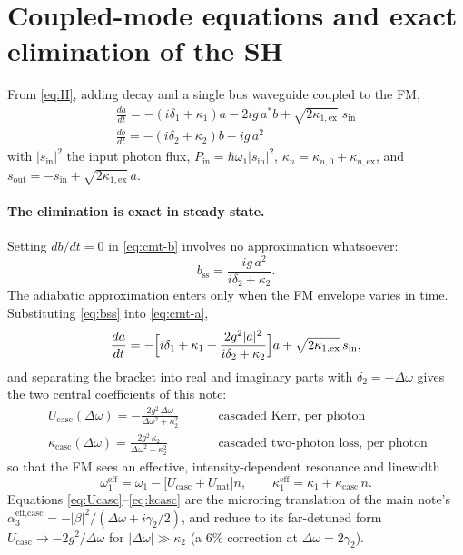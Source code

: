 \documentclass[11pt,a4paper]{article}
\newcommand{\Dom}{\Delta\omega}
\newcommand{\Ucasc}{U_{\text{casc}}}
\newcommand{\Unat}{U_{\text{nat}}}
\newcommand{\kcasc}{\kappa_{\text{casc}}}
\begin{document}
\section{Coupled-mode equations and exact elimination of the SH}
\label{sec:cmt}

From \eqref{eq:H}, adding decay and a single bus waveguide coupled to
the FM,
\begin{align}
  \boxed{\;\frac{da}{dt}=-(i\delta_1+\kappa_1)a-2ig\,a^*b
       +\sqrt{2\kappa_{1,\text{ex}}}\;s_{\text{in}}\;}
  \label{eq:cmt-a}\\[4pt]
  \boxed{\;\frac{db}{dt}=-(i\delta_2+\kappa_2)b-ig\,a^2\;}
  \label{eq:cmt-b}
\end{align}
with $|s_{\text{in}}|^2$ the input photon flux, $P_{\text{in}}=\hbar\omega_1|s_{\text{in}}|^2$,
$\kappa_n=\kappa_{n,0}+\kappa_{n,\text{ex}}$, and
$s_{\text{out}}=-s_{\text{in}}+\sqrt{2\kappa_{1,\text{ex}}}\,a$.

\paragraph{The elimination is exact in steady state.}  Setting
$db/dt=0$ in \eqref{eq:cmt-b} involves no approximation whatsoever:
\begin{equation}
  b_{\text{ss}}=\frac{-ig\,a^2}{i\delta_2+\kappa_2}.
  \label{eq:bss}
\end{equation}
The adiabatic approximation enters only when the FM envelope varies in
time.  Substituting \eqref{eq:bss} into \eqref{eq:cmt-a},
\begin{equation}
  \frac{da}{dt}=-\Bigl[i\delta_1+\kappa_1
     +\frac{2g^2|a|^2}{i\delta_2+\kappa_2}\Bigr]a
     +\sqrt{2\kappa_{1,\text{ex}}}\,s_{\text{in}} ,
\end{equation}
and separating the bracket into real and imaginary parts with
$\delta_2=-\Dom$ gives the two central coefficients of this note:
\begin{align}
  \boxed{\;\Ucasc(\Dom)=-\frac{2g^2\,\Dom}{\Dom^2+\kappa_2^2}\;}
  &\qquad\text{cascaded Kerr, per photon}
  \label{eq:Ucasc}\\[6pt]
  \boxed{\;\kcasc(\Dom)=\frac{2g^2\,\kappa_2}{\Dom^2+\kappa_2^2}\;}
  &\qquad\text{cascaded two-photon loss, per photon}
  \label{eq:kcasc}
\end{align}
so that the FM sees an effective, intensity-dependent resonance and
linewidth
\begin{equation}
  \omega_1^{\text{eff}}=\omega_1-\bigl[\Ucasc+\Unat\bigr]n,
  \qquad
  \kappa_1^{\text{eff}}=\kappa_1+\kcasc\,n .
  \label{eq:effective}
\end{equation}
Equations \eqref{eq:Ucasc}--\eqref{eq:kcasc} are the microring
translation of the main note's
$\alpha_3^{\text{eff,casc}}=-|\beta|^2/(\Dom+i\gamma_2/2)$, and reduce to
its far-detuned form $\Ucasc\to-2g^2/\Dom$ for $|\Dom|\gg\kappa_2$
(a $6\%$ correction at $\Dom=2\gamma_2$).
\end{document}
